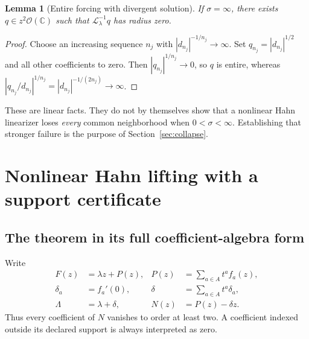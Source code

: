 \documentclass[11pt,a4paper]{article}
\numberwithin{equation}{section}
\newtheorem{lemma}[theorem]{Lemma}
\theoremstyle{definition}
\theoremstyle{remark}
\newcommand{\C}{\mathbb C}
\newcommand{\LL}{\mathcal L}
\begin{document}
\begin{lemma}[Entire forcing with divergent solution]\label{lem:entirebad}
If $\sigma=\infty$, there exists $q\in z^2\mathcal O(\C)$ such that
$\LL_\lambda^{-1}q$ has radius zero.
\end{lemma}

\begin{proof}
Choose an increasing sequence $n_j$ with
$|d_{n_j}|^{-1/n_j}\to\infty$. Set
$q_{n_j}=|d_{n_j}|^{1/2}$ and all other coefficients to zero. Then
$|q_{n_j}|^{1/n_j}\to0$, so $q$ is entire, whereas
$|q_{n_j}/d_{n_j}|^{1/n_j}=|d_{n_j}|^{-1/(2n_j)}\to\infty$.
\end{proof}

These are linear facts. They do not by themselves show that a nonlinear
Hahn linearizer loses \emph{every} common neighborhood when
$0<\sigma<\infty$. Establishing that stronger failure is the purpose of
Section~\ref{sec:collapse}.

\section{Nonlinear Hahn lifting with a support certificate}\label{sec:lifting}

\subsection{The theorem in its full coefficient-algebra form}

Write
\begin{equation}\label{eq:data}
 \begin{aligned}
 F(z)&=\lambda z+P(z),&P(z)&=\sum_{a\in A}t^a f_a(z),\\
 \delta_a&=f_a'(0),&\delta&=\sum_{a\in A}t^a\delta_a,\\
 \Lambda&=\lambda+\delta,&N(z)&=P(z)-\delta z.
 \end{aligned}
\end{equation}
Thus every coefficient of $N$ vanishes to order at least two.
A coefficient indexed outside its declared support is always interpreted
as zero.
\end{document}
